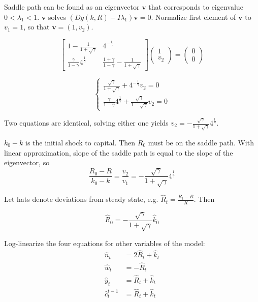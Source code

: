 \documentclass{article}
\begin{document}
\begin{enumerate}
Saddle path can be found as an eigenvector $\mathbf{v}$ that
corresponds to eigenvalue $0<\lambda_1<1$. $\mathbf{v}$ solves
$(Dg(k,R)-I\lambda_1)\mathbf{v}=0$. Normalize first element of
$\mathbf{v}$ to $v_1=1$, so that $\mathbf{v}=(1,v_2)$.

\begin{equation*}
    \begin{bmatrix}
    1-\frac{1}{1+\sqrt{\gamma}}& 4^{-\frac{1}{\gamma}}\\
    \frac{\gamma}{1-\gamma}4^{\frac{1}{\gamma}}&\frac{1+\gamma}{1-\gamma}-\frac{1}{1+\sqrt{\gamma}}
  \end{bmatrix}
  \begin{pmatrix}
    1\\
    v_2
  \end{pmatrix}=
\begin{pmatrix}
    0\\
    0
  \end{pmatrix}
\end{equation*}

\begin{equation*}
  \begin{cases}
    \frac{\sqrt{\gamma}}{1+\sqrt{\gamma}}+4^{-\frac{1}{\gamma}}v_2=0\\
    \frac{\gamma}{1-\gamma}4^{\frac{1}{\gamma}}+\frac{\sqrt{\gamma}}{1-\sqrt{\gamma}}v_2=0
  \end{cases}
\end{equation*}

Two equations are identical, solving either one yields
$v_2=-\frac{\sqrt{\gamma}}{1+\sqrt{\gamma}}4^{\frac{1}{\gamma}}$.

$k_0-k$ is the initial shock to capital. Then $R_0$ must be on the
saddle path. With linear approximation, slope of the saddle path is
equal to the slope of the eigenvector, so
\begin{equation*}
  \frac{R_0-R}{k_0-k}=\frac{v_2}{v_1}=-\frac{\sqrt{\gamma}}{1+\sqrt{\gamma}}4^{\frac{1}{\gamma}}  
\end{equation*}

Let hats denote deviations from steady state, e.g.
$\hat{R}_t=\frac{R_t-R}{R}$. Then

\begin{equation*}
  \hat{R}_0=-\frac{\sqrt{\gamma}}{1+\sqrt{\gamma}}\hat{k}_0
\end{equation*}

Log-linearize the four equations for other variables of the model:
\begin{align*}
  \hat{n}_t&=2\hat{R}_t+\hat{k}_t\\
  \hat{w}_t&=-\hat{R}_t\\
  \hat{y}_t&=\hat{R}_t+\hat{k}_t\\
  \hat{c}_t^{t-1}&=\hat{R}_t+\hat{k}_t
\end{align*}


\end{enumerate}
\end{document}
